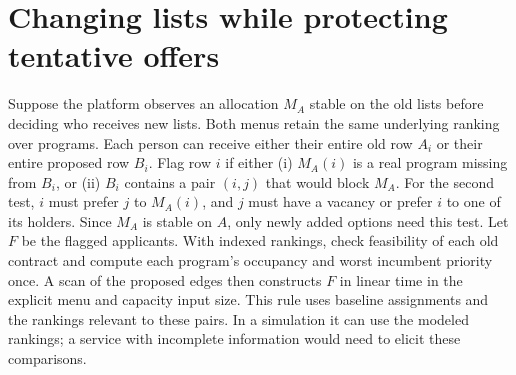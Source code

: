\section{Changing lists while protecting tentative offers}\label{sec:row-screen}

Suppose the platform observes an allocation $M_A$ stable on the old lists before deciding who receives new lists. Both menus retain the same underlying ranking over programs. Each person can receive either their entire old row $A_i$ or their entire proposed row $B_i$. Flag row $i$ if either (i) $M_A(i)$ is a real program missing from $B_i$, or (ii) $B_i$ contains a pair $(i,j)$ that would block $M_A$. For the second test, $i$ must prefer $j$ to $M_A(i)$, and $j$ must have a vacancy or prefer $i$ to one of its holders. Since $M_A$ is stable on $A$, only newly added options need this test. Let $F$ be the flagged applicants. With indexed rankings, check feasibility of each old contract and compute each program's occupancy and worst incumbent priority once. A scan of the proposed edges then constructs $F$ in linear time in the explicit menu and capacity input size. This rule uses baseline assignments and the rankings relevant to these pairs. In a simulation it can use the modeled rankings; a service with incomplete information would need to elicit these comparisons.

